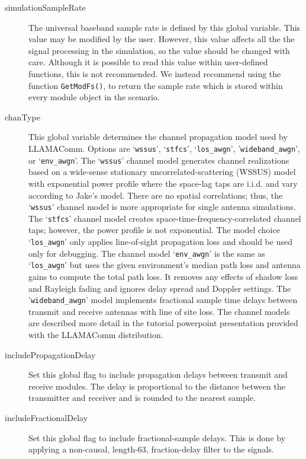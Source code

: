 \begin{description}
\item[simulationSampleRate] The universal baseband sample rate is defined by this global variable. This value may be modified by the user. However, this value affects all the the signal processing in the simulation, so the value should be changed with care. Although it is possible to read this value within user-defined functions, this is not recommended.  We instead recommend using the function \verb+GetModFs()+, to return the sample rate which is stored within every module object in the scenario.

\item[chanType] This global variable determines the channel propagation model used by LLAMAComm.  Options are `\verb+wssus+', `\verb+stfcs+', `\verb+los_awgn+', '\verb+wideband_awgn+', or `\verb+env_awgn+'.  The `\verb+wssus+' channel model generates channel realizations based on a wide-sense stationary uncorrelated-scattering (WSSUS) model with exponential power profile where the space-lag taps are i.i.d. and vary according to Jake's model.  There are no spatial correlations; thus, the `\verb+wssus+' channel model is more appropriate for single antenna simulations.  The `\verb+stfcs+' channel model creates space-time-frequency-correlated channel taps; however, the power profile is not exponential.  The model choice `\verb+los_awgn+' only applies line-of-sight propagation loss and should be used only for debugging.  The channel model `\verb+env_awgn+' is the same as `\verb+los_awgn+' but uses the given environment's median path loss and antenna gains to compute the total path loss.  It removes any effects of shadow loss and Rayleigh fading and ignores delay spread and Doppler settings. The '\verb+wideband_awgn+' model implements fractional sample time delays between transmit and receive antennas with line of site loss. The channel models are described more detail in the tutorial powerpoint presentation provided with the LLAMAComm distribution.

\item[includePropagationDelay]  Set this global flag to include propagation delays between transmit and receive modules.  The delay is proportional to the distance between the transmitter and receiver and is rounded to the nearest sample.

\item[includeFractionalDelay] Set this global flag to include fractional-sample delays.  This is done by applying a non-causal, length-63, fraction-delay filter to the signals.


\end{description}

